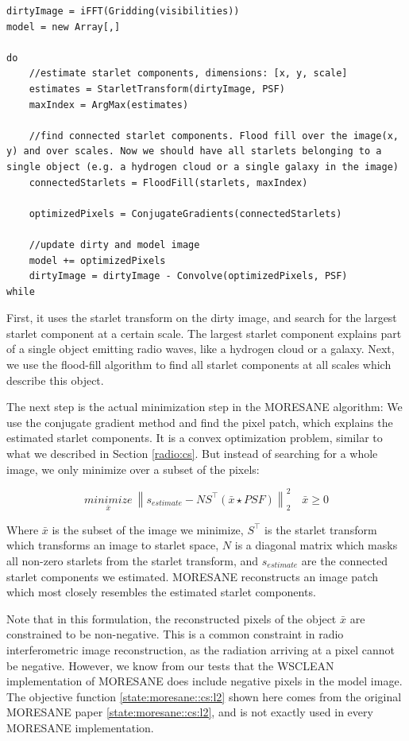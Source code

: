 \begin{lstlisting}
dirtyImage = iFFT(Gridding(visibilities))
model = new Array[,]

do
	//estimate starlet components, dimensions: [x, y, scale]
	estimates = StarletTransform(dirtyImage, PSF)
	maxIndex = ArgMax(estimates)
	
	//find connected starlet components. Flood fill over the image(x, y) and over scales. Now we should have all starlets belonging to a single object (e.g. a hydrogen cloud or a single galaxy in the image)
	connectedStarlets = FloodFill(starlets, maxIndex)
	
	optimizedPixels = ConjugateGradients(connectedStarlets)
	
	//update dirty and model image
	model += optimizedPixels
	dirtyImage = dirtyImage - Convolve(optimizedPixels, PSF)
while
\end{lstlisting}

First, it uses the starlet transform on the dirty image, and search for the largest starlet component at a certain scale. The largest starlet component explains part of a single object emitting radio waves, like a hydrogen cloud or a galaxy. Next, we use the flood-fill algorithm to find all starlet components at all scales which describe this object.

The next step is the actual minimization step in the MORESANE algorithm: We use the conjugate gradient method and find the pixel patch, which explains the estimated starlet components. It is a convex optimization problem, similar to what we described in Section \ref{radio:cs}. But instead of searching for a whole image, we only minimize over a subset of the pixels:

\begin{equation}\label{state:moresane::cs:l2}
\underset{\bar{x}}{minimize} \: \left \| s_{estimate} - NS^\intercal(\bar{x} \star PSF) \right \|_2^2 \quad \bar{x} \geq 0
\end{equation}

Where $\bar{x}$ is the subset of the image we minimize, $S^\intercal$ is the starlet transform which transforms an image to starlet space, $N$ is a diagonal matrix which masks all non-zero starlets from the starlet transform, and $s_{estimate}$ are the connected starlet components we estimated. MORESANE reconstructs an image patch which most closely resembles the estimated starlet components.

Note that in this formulation, the reconstructed pixels of the object $\bar{x}$ are constrained to be non-negative. This is a common constraint in radio interferometric image reconstruction, as the radiation arriving at a pixel cannot be negative. However, we know from our tests that the WSCLEAN implementation of MORESANE does include negative pixels in the model image. The objective function \ref{state:moresane::cs:l2} shown here comes from the original MORESANE paper \eqref{state:moresane::cs:l2}, and  is not exactly used in every MORESANE implementation.




